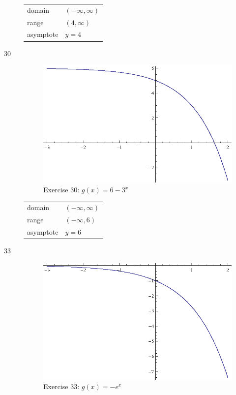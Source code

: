 \documentclass{exam}
\begin{document}
\begin{description}
        \begin{tabular}[H]{ll}
          \toprule
          domain    & $(-\infty, \infty)$ \\
          range     & $(4, \infty)$ \\
          asymptote & $y = 4$ \\
          \bottomrule
        \end{tabular}

      \item[30] 
        \begin{figure}[H]
          \centering
          \includegraphics[scale=0.9]{exercise30.eps}
          \caption*{Exercise 30: $g(x) = 6 - 3^x$}
        \end{figure}

        \begin{tabular}[H]{ll}
          \toprule
          domain    & $(-\infty, \infty)$ \\
          range     & $(-\infty, 6)$ \\
          asymptote & $y = 6$ \\
          \bottomrule
        \end{tabular}

      \item[33] 
        \begin{figure}[H]
          \centering
          \includegraphics[scale=0.9]{exercise33.eps}
          \caption*{Exercise 33: $g(x) = -e^x$}
        \end{figure}


\end{description}
\end{document}
